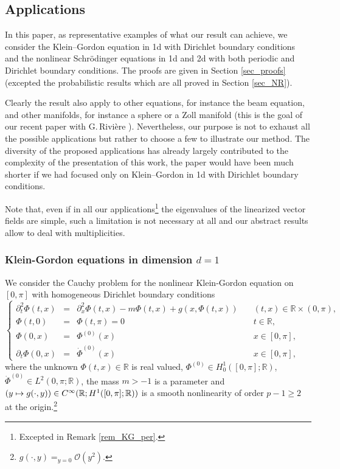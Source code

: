 \documentclass[JEP,XML,SOM,Unicode,NoEqCountersInSection,published]{cedram}
\newcommand\mto{\mathchoice{\longmapsto}{\mapsto}{\mapsto}{\mapsto}}
\theoremstyle{definition}
\begin{document}
\subsection{Applications}
In this paper, as representative examples of what our result can achieve, we consider the Klein--Gordon equation in 1d with Dirichlet boundary conditions and the nonlinear Schrödinger equations in 1d and 2d with both periodic and Dirichlet boundary conditions. The proofs are given in Section \ref{sec_proofs} (excepted the probabilistic results which are all proved in Section \ref{sec_NR}).

Clearly the result also apply to other equations, for instance the beam equation, and other manifolds, for instance a sphere or a Zoll manifold (this is the goal of our recent paper with G.\,Rivière \cite{BGR}). Nevertheless, our purpose is not to exhaust all the possible applications but rather to choose a few to illustrate our method. The diversity of the proposed applications has already largely contributed to the complexity of the presentation of this work, the paper would have been much shorter if we had focused only on Klein--Gordon in 1d with Dirichlet boundary conditions.

Note that, even if in all our applications\footnote{Excepted in Remark \ref{rem_KG_per}.} the eigenvalues of the linearized vector fields are simple, such a limitation is not necessary at all and our abstract results allow to deal with multiplicities.

\subsubsection{Klein-Gordon equations in dimension $d=1$}
\label{sub_sec_KG}
We consider the Cauchy problem for the nonlinear Klein-Gordon equation on $[0,\pi]$ with homogeneous Dirichlet boundary conditions
\begin{equation}
\label{eq_KG}
\tag{KG}
\left\{ \begin{array}{rclll} \partial_t^2 \Phi(t,x) &=& \partial_x^2 \Phi(t,x) - m \Phi(t,x) + g(x,\Phi(t,x)) & \quad(t,x)\in \mathbb{R}\times (0,\pi), \\
\Phi(t,0) &=& \Phi(t,\pi) = 0 & \quad t\in \mathbb{R}, \\
\Phi(0,x) &=& \Phi^{(0)}(x) & \quad x\in [0,\pi], \\
\partial_t \Phi(0,x) &=& \dot{\Phi}^{(0)}(x) & \quad x\in [0,\pi],
\end{array}
\right.
\end{equation}
where the unknown $\Phi(t,x)\in \mathbb{R}$ is real valued, $\Phi^{(0)} \in H^1_0([0,\pi];\mathbb{R})$, $\dot{\Phi}^{(0)} \in L^2(0,\pi;\mathbb{R})$, the mass $m>-1$ is a parameter and $(y \mto g(\cdot,y)) \in C^\infty(\mathbb{R}; H^{1}([0,\pi];\mathbb{R}))$ is a smooth nonlinearity of order $p-1\geq 2$ at the origin.\footnote{ \ie $\displaystyle g(\cdot,y) \mathop{=}_{y=0} \mathcal{O}(y^2)$.}
\end{document}
